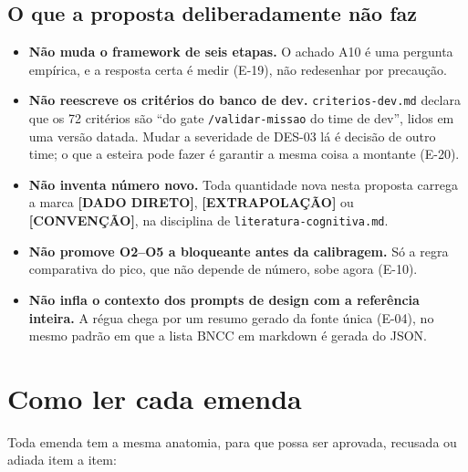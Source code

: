 \documentclass[11pt,a4paper]{article}
\newcommand{\dado}{\textbf{[DADO DIRETO]}}
\newcommand{\extrap}{\textbf{[EXTRAPOLAÇÃO]}}
\newcommand{\conv}{\textbf{[CONVENÇÃO]}}
\begin{document}
\subsection{O que a proposta deliberadamente não faz}

\begin{itemize}
  \item \textbf{Não muda o framework de seis etapas.} O achado A10 é uma pergunta empírica, e a
        resposta certa é medir (E-19), não redesenhar por precaução.
  \item \textbf{Não reescreve os critérios do banco de dev.} \texttt{criterios-dev.md} declara que
        os 72 critérios são ``do gate \texttt{/validar-missao} do time de dev'', lidos em uma
        versão datada. Mudar a severidade de DES-03 lá é decisão de outro time; o que a esteira
        pode fazer é garantir a mesma coisa a montante (E-20).
  \item \textbf{Não inventa número novo.} Toda quantidade nova nesta proposta carrega a marca
        \dado, \extrap{} ou \conv{}, na disciplina de \texttt{literatura-cognitiva.md}.
  \item \textbf{Não promove O2--O5 a bloqueante antes da calibragem.} Só a regra comparativa do
        pico, que não depende de número, sobe agora (E-10).
  \item \textbf{Não infla o contexto dos prompts de design com a referência inteira.} A régua chega
        por um resumo gerado da fonte única (E-04), no mesmo padrão em que a lista BNCC em
        markdown é gerada do JSON.
\end{itemize}

\section{Como ler cada emenda}

Toda emenda tem a mesma anatomia, para que possa ser aprovada, recusada ou adiada item a item:
\end{document}
